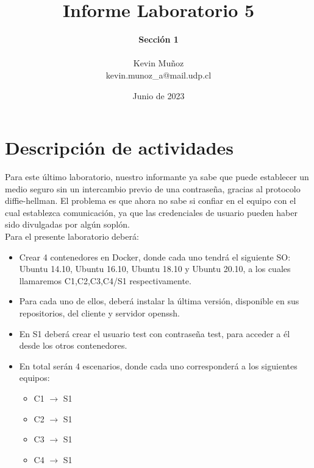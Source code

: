 \documentclass[letter,12pt]{article}
\begin{document}
%
   \title{\Huge{Informe Laboratorio 5}}

   \author{\textbf{Sección 1} \\  \\Kevin Muñoz \\ kevin.munoz\_a@mail.udp.cl}
          
   \date{Junio de 2023}

   \maketitle
   
   \tableofcontents
 
  \newpage
  

\section{Descripción de actividades}
Para este último laboratorio, nuestro informante ya sabe que puede establecer un medio seguro sin un intercambio previo de una contraseña, gracias al protocolo diffie-hellman. El problema es que ahora no sabe si confiar en el equipo con el cual establezca comunicación, ya que las credenciales de usuario pueden haber sido divulgadas por algún soplón.\\

Para el presente laboratorio deberá:

\begin{itemize}
    \item Crear 4 contenedores en Docker, donde cada uno tendrá el siguiente SO:
        Ubuntu 14.10, Ubuntu 16.10, Ubuntu 18.10 y Ubuntu 20.10, a los cuales llamaremos C1,C2,C3,C4/S1 respectivamente.
        
    \item Para cada uno de ellos, deberá instalar la última versión, disponible en sus repositorios, del cliente y servidor openssh.

    \item En S1 deberá crear el usuario test con contraseña test, para acceder a él desde los otros contenedores.
    
    \item En total serán 4 escenarios, donde cada uno corresponderá a los siguientes equipos:
    \begin{itemize}
        \item C1 $\rightarrow$ S1
        \item C2 $\rightarrow$ S1
        \item C3 $\rightarrow$ S1
        \item C4 $\rightarrow$ S1
    \end{itemize}
\end{itemize}
\end{document}
